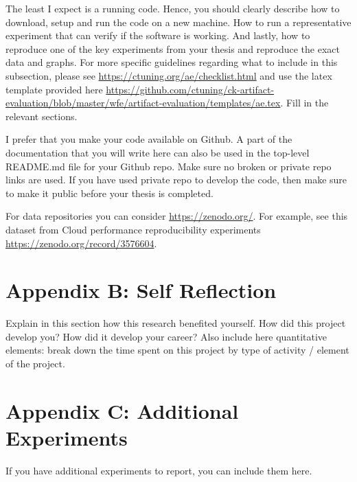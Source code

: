 \documentclass{article}
\begin{document}
The least I expect is a running code. Hence, you should clearly describe how to download, setup and run the code on a new machine. How to run a representative experiment that can verify if the software is working. And lastly, how to reproduce one of the key experiments from your thesis and reproduce the exact data and graphs. For more specific guidelines regarding what to include in this subsection, please see \url{https://ctuning.org/ae/checklist.html} and use the latex template provided here \url{https://github.com/ctuning/ck-artifact-evaluation/blob/master/wfe/artifact-evaluation/templates/ae.tex}. Fill in the relevant sections. 

I prefer that you make your code available on Github. A part of the documentation that you will write here can also be used in the top-level README.md file for your Github repo. Make sure no broken or private repo links are used. If you have used private repo to develop the code, then make sure to make it public before your thesis is completed. 

For data repositories you can consider \url{https://zenodo.org/}. For example, see this dataset from Cloud performance reproducibility experiments \url{https://zenodo.org/record/3576604}. 

\newpage 
\section*{Appendix B: Self Reflection}
Explain in this section how this research benefited yourself. How did this project develop you? How did it develop your career? Also include here quantitative elements: break down the time spent on this project by type of activity / element of the project.

\newpage 
\section*{Appendix C: Additional Experiments}
If you have additional experiments to report, you can include them here. 

\end{document}
